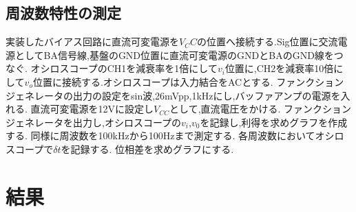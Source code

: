 \documentclass[a4j,10pt,dvipdfmx]{jarticle}
\begin{document}
\subsection{周波数特性の測定}
実装したバイアス回路に直流可変電源を$V_CC$の位置へ接続する.Sig位置に交流電源としてBA信号線,基盤のGND位置に直流可変電源のGNDとBAのGND線をつなぐ.
オシロスコープのCH1を減衰率を1倍にして$v_i$位置に,CH2を減衰率10倍にして$v_o$位置に接続する.オシロスコープは入力結合をACとする.
ファンクションジェネレータの出力の設定をsin波,26mVpp,1kHzにし,バッファアンプの電源を入れる.
直流可変電源を12Vに設定し$V_{CC}$として,直流電圧をかける.
ファンクションジェネレータを出力し,オシロスコープの$v_i$,$v_0$を記録し,利得を求めグラフを作成する.
同様に周波数を100kHzから100Hzまで測定する.
各周波数においてオシロスコープで$\delta{t}$を記録する.
位相差を求めグラフにする.
\section{結果}
\end{document}
